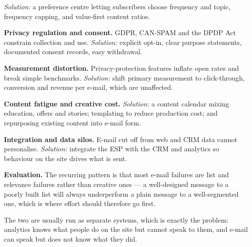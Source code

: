 \begin{qlist}
\begin{apts}
      \emph{Solution:} a preference centre letting subscribers choose frequency
      and topic, frequency capping, and value-first content ratios.
\item \textbf{Privacy regulation and consent.} GDPR, CAN-SPAM and the DPDP Act
      constrain collection and use. \emph{Solution:} explicit opt-in, clear
      purpose statements, documented consent records, easy withdrawal.
\item \textbf{Measurement distortion.} Privacy-protection features inflate open
      rates and break simple benchmarks. \emph{Solution:} shift primary
      measurement to click-through, conversion and revenue per e-mail, which are
      unaffected.
\item \textbf{Content fatigue and creative cost.} \emph{Solution:} a content
      calendar mixing education, offers and stories; templating to reduce
      production cost; and repurposing existing content into e-mail form.
\item \textbf{Integration and data silos.} E-mail cut off from web and CRM data
      cannot personalise. \emph{Solution:} integrate the ESP with the CRM and
      analytics so behaviour on the site drives what is sent.
\end{apts}

\textbf{Evaluation.} The recurring pattern is that most e-mail failures are
list and relevance failures rather than creative ones --- a well-designed
message to a poorly built list will always underperform a plain message to a
well-segmented one, which is where effort should therefore go first.

The two are usually run as separate systems, which is exactly the problem:
analytics knows what people do on the site but cannot speak to them, and e-mail
can speak but does not know what they did.


\end{qlist}
